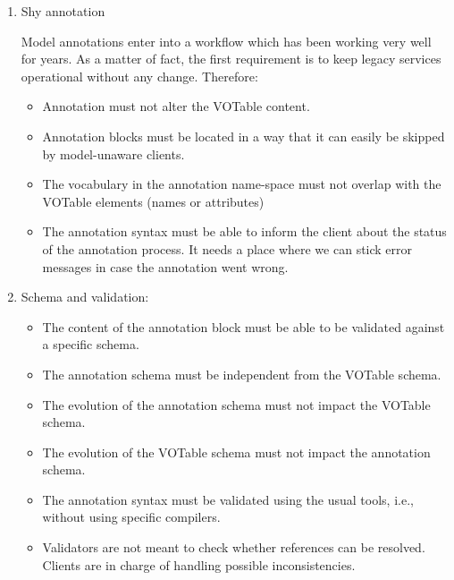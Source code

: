 \begin {enumerate}
  \item Shy annotation 
  
  	Model annotations enter into a workflow which has been working very well for years. As a matter of fact, the first requirement is to keep 
	legacy services operational without any change. Therefore: 
	
  \begin {itemize}
    \item Annotation must not alter the VOTable content.
    \item Annotation blocks must be located in a way that it can easily be skipped by model-unaware clients.
    \item The vocabulary in the annotation name-space must not overlap with the VOTable elements (names or attributes)    
    \item The annotation syntax must be able to inform the client about the status of the annotation process.
          It needs a place where we can stick error messages in case the annotation went wrong.
  \end {itemize}
  
  \item Schema and validation:
  \begin {itemize}
     \item The content of the annotation block must be able to be validated against a specific schema.
    \item The annotation schema must be independent from the VOTable schema.
    \item The evolution of the annotation schema must not impact the VOTable schema.
    \item The evolution of the VOTable schema must not impact the annotation schema.
    \item The annotation syntax must be validated using the usual tools, i.e., without using specific compilers.
    \item Validators are not meant to check whether references can be resolved. Clients are in charge of handling possible inconsistencies.
  \end {itemize}
  

\end{enumerate}
